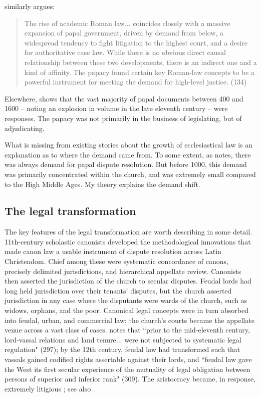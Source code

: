 \documentclass[12pt]{article}
\theoremstyle{definition}
\theoremstyle{remark}
\begin{document}
 \citet{davray_2023} similarly argues:

\begin{quote}
    The rise of academic Roman law... coincides closely with a massive expansion of papal government, driven by demand from below, a widespread tendency to fight litigation to the highest court, and a desire for authoritative case law. While there is no obvious direct causal relationship between these two developments, there is an indirect one and a kind of affinity. The papacy found certain key Roman-law concepts to be a powerful instrument for meeting the demand for high-level justice. (134)
\end{quote}

Elsewhere, \citet[38]{davray_2023} shows that the vast majority of papal documents between 400 and 1600 -- noting an explosion in volume in the late eleventh century -- were responses. The papacy was not primarily in the business of legislating, but of adjudicating.

What is missing from existing stories about the growth of ecclesiastical law is an explanation as to where the demand came from. To some extent, as \citet{davray_2023} notes, there was always demand for papal dispute resolution. But before 1000, this demand was primarily concentrated within the church, and was extremely small compared to the High Middle Ages. My theory explains the demand shift.

\subsection{The legal transformation}

The key features of the legal transformation are worth describing in some detail. 11th-century scholastic canonists developed the methodological innovations that made canon law a usable instrument of dispute resolution across Latin Christendom. Chief among these were systematic concordance of canons, precisely delimited jurisdictions, and hierarchical appellate review. Canonists then asserted the jurisdiction of the church to secular disputes. Feudal lords had long held jurisdiction over their tenants' disputes, but the church asserted jurisdiction in any case where the disputants were wards of the church, such as widows, orphans, and the poor. Canonical legal concepts were in turn absorbed into feudal, urban, and commercial law; the church's courts became the appellate venue across a vast class of cases. \citet{berman_1983} notes that ``prior to the mid-eleventh century, lord-vassal relations and land tenure... were not subjected to systematic legal regulation" (297); by the 12th century, feudal law had transformed such that vassals gained codified rights assertable against their lords, and ``feudal law gave the West its first secular experience of the mutuality of legal obligation between persons of superior and inferior rank" (309). The aristocracy became, in response, extremely litigious \citep[309]{berman_1983}; see also \citet[40]{heer_1962}.
\end{document}
